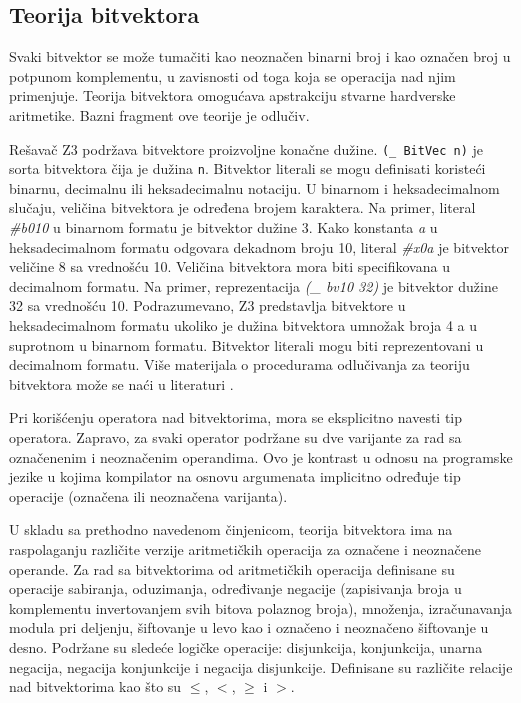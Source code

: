 \documentclass[12pt,oneside]{memoir}
\begin{document}
\subsection{Teorija bitvektora} 
Svaki bitvektor se može tumačiti kao neoznačen binarni broj i kao označen broj u potpunom komplementu, u zavisnosti od toga koja se operacija nad njim primenjuje. Teorija bitvektora omogućava apstrakciju stvarne hardverske aritmetike. Bazni fragment ove teorije je odlučiv. \par
Rešavač Z3 podržava bitvektore proizvoljne konačne dužine. \texttt{(\_ BitVec n)} je sorta bitvektora čija je dužina \texttt{n}. Bitvektor literali se mogu definisati koristeći binarnu, decimalnu ili heksadecimalnu notaciju. U binarnom i heksadecimalnom slučaju, veličina bitvektora je određena brojem karaktera. Na primer, literal \textit{\#b010} u binarnom formatu je bitvektor dužine 3. Kako konstanta \textit{a} u heksadecimalnom formatu odgovara dekadnom broju 10, literal \textit{\#x0a} je bitvektor veličine 8 sa vrednošću 10. Veličina bitvektora mora biti specifikovana u decimalnom formatu. Na primer, reprezentacija \textit{(\_ bv10 32)} je bitvektor dužine 32 sa vrednošću 10. Podrazumevano, Z3 predstavlja bitvektore u heksadecimalnom formatu ukoliko je dužina bitvektora umnožak broja 4 a u suprotnom u binarnom formatu. Bitvektor literali mogu biti reprezentovani u decimalnom formatu. Više materijala o procedurama odlučivanja za teoriju bitvektora može se naći u literaturi \cite{DPBitvector}.

Pri korišćenju operatora nad bitvektorima, mora se eksplicitno navesti tip operatora. Zapravo, za svaki operator podržane su dve varijante za rad sa označenenim i neoznačenim operandima. Ovo je kontrast u odnosu na programske jezike u kojima kompilator na osnovu argumenata implicitno određuje tip operacije (označena ili neoznačena varijanta).
\par
U skladu sa prethodno navedenom činjenicom, teorija bitvektora ima na raspolaganju različite verzije aritmetičkih operacija za označene i neoznačene operande. Za rad sa bitvektorima od aritmetičkih operacija definisane su operacije sabiranja, oduzimanja, određivanje negacije (zapisivanja broja u komplementu invertovanjem svih bitova polaznog broja), množenja, izračunavanja modula pri deljenju, šiftovanje u levo kao i označeno i neoznačeno šiftovanje u desno. Podržane su sledeće logičke operacije: disjunkcija, konjunkcija, unarna negacija, negacija konjunkcije i negacija disjunkcije. Definisane su različite relacije nad bitvektorima kao što su $\leq$, $<$, $\geq$ i $>$.
\end{document}
